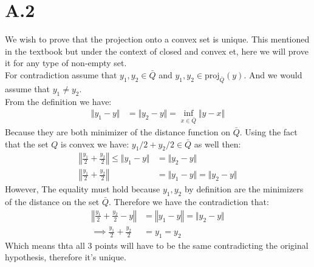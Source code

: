 \documentclass[]{article}
\begin{document}
    \section*{A.2}\label{sec:A.2}
        We wish to prove that the projection onto a convex set is unique. This mentioned in the textbook but under the context of closed and convex et, here we will prove it for any type of non-empty set. 
        \\[1.1em]
        For contradiction assume that $y_1, y_2 \in \bar{Q}$ and $y_1, y_2 \in \text{proj}_{\bar{Q}}(y)$. And we would assume that $y_1 \neq y_2$. 
        \\
        From the definition we have: 
        \begin{align*}\tag{A.2.1}\label{eqn:A.2.1}
            \Vert y_1 - y\Vert &= \Vert y_2 - y\Vert = \inf_{x \in \bar{Q}} \Vert y - x\Vert
        \end{align*}
        Because they are both minimizer of the distance function on $\bar{Q}$. Using the fact that the set $Q$ is convex we have: $y_1/2 + y_2/2 \in \bar{Q}$ as well then: 
        \begin{align*}\tag{A.2.2}\label{eqn:A.2.2}
            \left\Vert \frac{y_1}{2} + \frac{y_2}{2}\right\Vert \le \Vert y_1 - y\Vert &= 
            \Vert y_2 - y\Vert
            \\
            \left\Vert \frac{y_1}{2} + \frac{y_2}{2}\right\Vert
            &= 
            \Vert y_1 - y\Vert = 
            \Vert y_2 - y\Vert
        \end{align*}
        However, The equality must hold because $y_1, y_2$ by definition are the minimizers of the distance on the set $\bar{Q}$. Therefore we have the contradiction that: 
        \begin{align*}\tag{A.2.3}\label{eqn:A.2.3}
            \left\Vert
                 \frac{y_1}{2} + \frac{y_2}{2} - y
            \right\Vert &= 
            \left\Vert
                y_1 - y
            \right\Vert = \Vert y_2 - y\Vert
            \\
            \implies 
            \frac{y_1}{2} + \frac{y_2}{2}
            &= y_1 = y_2
        \end{align*}
        Which means thta all 3 points will have to be the same contradicting the original hypothesis, therefore it's unique. 

    
\end{document}
